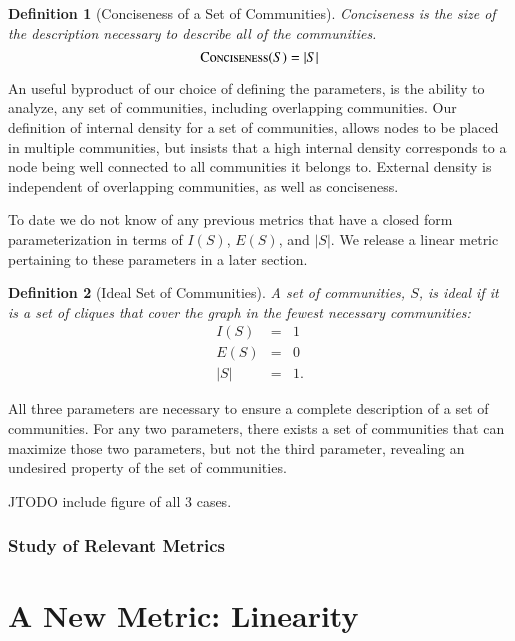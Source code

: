 \documentclass[phd,tocprelim]{cornell}
\newtheorem{definition}{Definition}
\begin{document}
\begin{definition}[Conciseness of a Set of Communities]  Conciseness is the size of the description necessary to describe all of the communities.
\begin{equation}
\mbox{\sc Conciseness}(S) = |S|
\end{equation}
\label{def_conciseness}
\end{definition}

An useful byproduct of our choice of defining the parameters, is the ability to analyze, any set of communities, including overlapping communities.  Our definition of internal density for a set of communities, allows nodes to be placed in multiple communities, but insists that a high internal density corresponds to a node being well connected to all communities it belongs to.  External density is independent of overlapping communities, as well as conciseness.

To date we do not know of any previous metrics that have a closed form parameterization in terms of $I(S)$, $E(S)$, and $|S|$. We release a linear metric pertaining to these parameters in a later section.
\begin{definition}[Ideal Set of Communities]
A set of communities, $S$, is ideal if it is a set of cliques that cover the graph in the fewest necessary communities:
\begin{eqnarray*}
I(S) &=& 1\\
 E(S) &=& 0 \\
|S| &=& 1.
\end{eqnarray*}
\end{definition}


All three parameters are necessary to ensure a complete description of a set of communities.  For any two parameters, there exists a set of communities that can maximize those two parameters, but not the third parameter, revealing an undesired property of the set of communities.

JTODO include figure of all 3 cases.

\subsection{Study of Relevant Metrics}


\chapter{A New Metric: Linearity}
\end{document}
